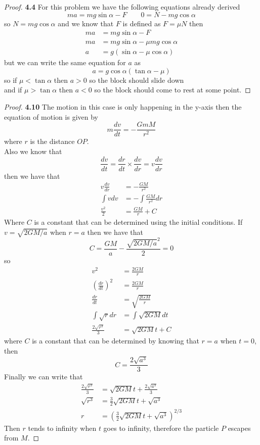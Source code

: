 \documentclass[11pt]{article}
\theoremstyle{definition}
\begin{document}
    \begin{proof}{\textbf{4.4}}
        For this problem we have the following equations already derived
        $$ma = mg\sin\alpha - F \quad\quad 0 = N - mg\cos\alpha$$
        so $N = mg\cos\alpha$ and we know that $F$ is defined as $F = \mu N$
        then
        \begin{align*}
            ma &= mg\sin\alpha - F\\
            ma &= mg\sin\alpha - \mu mg\cos\alpha\\
             a &= g(\sin\alpha - \mu\cos\alpha)
        \end{align*}
        but we can write the same equation for $a$ as
        $$a = g\cos\alpha (\tan\alpha - \mu)$$
        so if $\mu < \tan\alpha$ then $a > 0$ so the block should slide down\\
        and if $\mu > \tan\alpha$ then $a < 0$ so the block should come to rest
        at some point.
    \end{proof}
    \begin{proof}{\textbf{4.10}}
        The motion in this case is only happening in the y-axis then the
        equation of motion is given by 
        $$m \frac{dv}{dt} = -\frac{GmM}{r^2}$$
        where $r$ is the distance $OP$.\\
        Also we know that
        $$\frac{dv}{dt} = \frac{dr}{dt}\times\frac{dv}{dr} = v\frac{dv}{dr}$$
        then we have that
        \begin{align*}
            v\frac{dv}{dr} &= -\frac{GM}{r^2}\\
            \int vdv &= -\int \frac{GM}{r^2}dr\\
            \frac{v^2}{2} &= \frac{GM}{r} + C
        \end{align*}
        Where $C$ is a constant that can be determined using the initial
        conditions. If $v = \sqrt{2GM/a}$ when $r = a$ then we have
        that 
        $$C = \frac{GM}{a} - \frac{\sqrt{2GM/a}^2}{2} = 0$$
        so
        \begin{align*}
            v^2 &= \frac{2GM}{r}\\
            \left(\frac{dr}{dt}\right)^2 &= \frac{2GM}{r}\\
            \frac{dr}{dt} &= \sqrt{\frac{2GM}{r}}\\
            \int \sqrt{r}dr &= \int \sqrt{2GM}dt\\
            \frac{2\sqrt{r^3}}{3} &= \sqrt{2GM}t + C
        \end{align*}
        where $C$ is a constant that can be determined by knowing that $r=a$
        when $t = 0$, then
        $$C = \frac{2\sqrt{a^3}}{3}$$
        Finally we can write that
        \begin{align*}
            \frac{2\sqrt{r^3}}{3} &= \sqrt{2GM}t + \frac{2\sqrt{a^3}}{3}\\
            \sqrt{r^3} &= \frac{3}{2}\sqrt{2GM}t + \sqrt{a^3}\\
            r &= \left(\frac{3}{2}\sqrt{2GM}t + \sqrt{a^3}\right)^{2/3}
        \end{align*}
        Then $r$ tends to infinity when $t$ goes to infinity, therefore the
        particle $P$ escapes from $M$.
    \end{proof}
\end{document}
